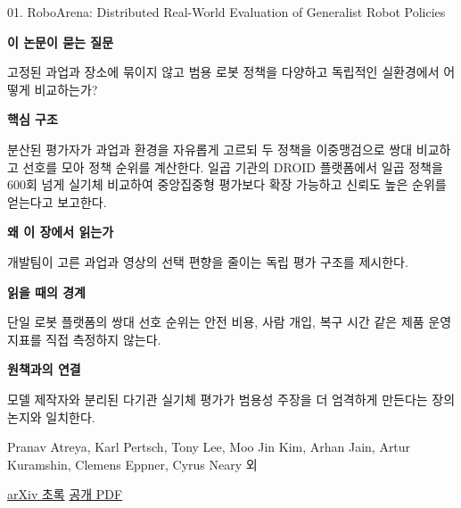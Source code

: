 \documentclass[11pt,openany]{book}
\begin{document}
\begin{termcard}{01. RoboArena: Distributed Real-World Evaluation of Generalist Robot Policies}

\par

\medskip

{\sffamily\bfseries\color{deepblue} 이 논문이 묻는 질문}\par

고정된 과업과 장소에 묶이지 않고 범용 로봇 정책을 다양하고 독립적인 실환경에서 어떻게 비교하는가?

\smallskip

{\sffamily\bfseries\color{deepblue} 핵심 구조}\par

분산된 평가자가 과업과 환경을 자유롭게 고르되 두 정책을 이중맹검으로 쌍대 비교하고 선호를 모아 정책 순위를 계산한다. 일곱 기관의 DROID 플랫폼에서 일곱 정책을 600회 넘게 실기체 비교하여 중앙집중형 평가보다 확장 가능하고 신뢰도 높은 순위를 얻는다고 보고한다.

\smallskip

{\sffamily\bfseries\color{deepblue} 왜 이 장에서 읽는가}\par

개발팀이 고른 과업과 영상의 선택 편향을 줄이는 독립 평가 구조를 제시한다.

\smallskip

{\sffamily\bfseries\color{coral} 읽을 때의 경계}\par

단일 로봇 플랫폼의 쌍대 선호 순위는 안전 비용, 사람 개입, 복구 시간 같은 제품 운영 지표를 직접 측정하지 않는다.

\smallskip

{\sffamily\bfseries\color{teal} 원책과의 연결}\par

모델 제작자와 분리된 다기관 실기체 평가가 범용성 주장을 더 엄격하게 만든다는 장의 논지와 일치한다.

\medskip

{\footnotesize\color{muted} Pranav Atreya, Karl Pertsch, Tony Lee, Moo Jin Kim, Arhan Jain, Artur Kuramshin, Clemens Eppner, Cyrus Neary 외\par

\href{https://arxiv.org/abs/2506.18123}{arXiv 초록} \quad \href{https://arxiv.org/pdf/2506.18123}{공개 PDF}\par}

\end{termcard}
\end{document}
